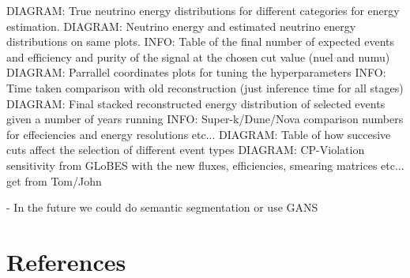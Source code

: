 DIAGRAM: True neutrino energy distributions for different categories for energy estimation.
DIAGRAM: Neutrino energy and estimated neutrino energy distributions on same plots.
INFO: Table of the final number of expected events and efficiency and purity of the signal at the chosen cut value (nuel and numu)
DIAGRAM: Parrallel coordinates plots for tuning the hyperparameters
INFO: Time taken comparison with old reconstruction (just inference time for all stages)
DIAGRAM: Final stacked reconstructed energy distribution of selected events given a number of years running
INFO: Super-k/Dune/Nova comparison numbers for effeciencies and energy resolutions etc...
DIAGRAM: Table of how succesive cuts affect the selection of different event types
DIAGRAM: CP-Violation sensitivity from GLoBES with the new fluxes, efficiencies, smearing matrices etc... get from Tom/John

- In the future we could do semantic segmentation or use GANS

\section{References}

